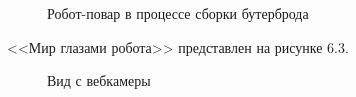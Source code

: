 \begin{figure}[h!]
\caption{Робот-повар в процессе сборки бутерброда}
\end{figure}

\newpage

<<Мир глазами робота>> представлен на рисунке 6.3.
 
\begin{figure}[h!]
\caption{Вид с вебкамеры}
\end{figure}